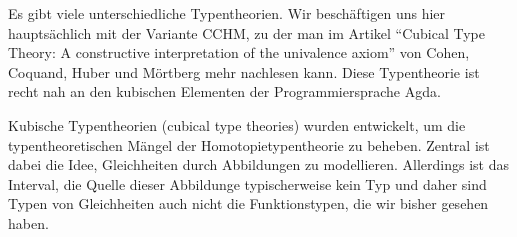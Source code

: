 Es gibt viele unterschiedliche Typentheorien.
Wir beschäftigen uns hier hauptsächlich mit der Variante CCHM, zu der man im Artikel ``Cubical Type Theory: A constructive interpretation of the univalence axiom'' von Cohen, Coquand, Huber und Mörtberg mehr nachlesen kann.
Diese Typentheorie ist recht nah an den kubischen Elementen der Programmiersprache Agda.

Kubische Typentheorien (cubical type theories) wurden entwickelt,
um die typentheoretischen Mängel der Homotopietypentheorie zu beheben.
Zentral ist dabei die Idee, Gleichheiten durch Abbildungen zu modellieren.
Allerdings ist das Interval, die Quelle dieser Abbildunge typischerweise kein Typ und daher sind Typen von Gleichheiten auch nicht die Funktionstypen, die wir bisher gesehen haben.

